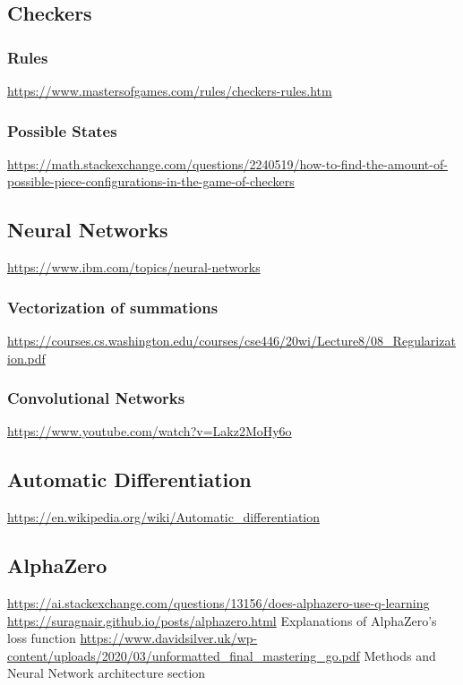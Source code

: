 \documentclass{article}
\begin{document}
    \subsection{Checkers}
    \subsubsection{Rules}
    \noindent \url{https://www.mastersofgames.com/rules/checkers-rules.htm}
    \subsubsection{Possible States}
    \noindent \url{https://math.stackexchange.com/questions/2240519/how-to-find-the-amount-of-possible-piece-configurations-in-the-game-of-checkers}
    
    \subsection{Neural Networks}
    \noindent \url{https://www.ibm.com/topics/neural-networks}

    \subsubsection{Vectorization of summations}
    \noindent \url{https://courses.cs.washington.edu/courses/cse446/20wi/Lecture8/08_Regularization.pdf}

    \subsubsection{Convolutional Networks}
    \noindent \url{https://www.youtube.com/watch?v=Lakz2MoHy6o}\\

    \subsection{Automatic Differentiation}
    \noindent \url{https://en.wikipedia.org/wiki/Automatic_differentiation}

    \subsection{AlphaZero}
    \noindent \url{https://ai.stackexchange.com/questions/13156/does-alphazero-use-q-learning}
    \noindent \url{https://suragnair.github.io/posts/alphazero.html}
    Explanations of AlphaZero's loss function
    \noindent \url{https://www.davidsilver.uk/wp-content/uploads/2020/03/unformatted_final_mastering_go.pdf} Methods and Neural Network architecture section
\end{document}
